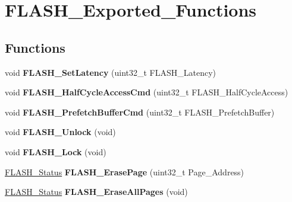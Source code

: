 \hypertarget{group__FLASH__Exported__Functions}{
\section{FLASH\_\-Exported\_\-Functions}
\label{group__FLASH__Exported__Functions}
}
\subsection*{Functions}
\begin{DoxyCompactItemize}
\item 
\hypertarget{group__FLASH__Exported__Functions_ga54bcb96270215c752c3479c8c9e438c0}{
void {\bfseries FLASH\_\-SetLatency} (uint32\_\-t FLASH\_\-Latency)}
\label{group__FLASH__Exported__Functions_ga54bcb96270215c752c3479c8c9e438c0}

\item 
\hypertarget{group__FLASH__Exported__Functions_ga978103a57b37920ac01128e999f9ece6}{
void {\bfseries FLASH\_\-HalfCycleAccessCmd} (uint32\_\-t FLASH\_\-HalfCycleAccess)}
\label{group__FLASH__Exported__Functions_ga978103a57b37920ac01128e999f9ece6}

\item 
\hypertarget{group__FLASH__Exported__Functions_ga6b93faaf0f560bf8d662b2cefe2f70e8}{
void {\bfseries FLASH\_\-PrefetchBufferCmd} (uint32\_\-t FLASH\_\-PrefetchBuffer)}
\label{group__FLASH__Exported__Functions_ga6b93faaf0f560bf8d662b2cefe2f70e8}

\item 
\hypertarget{group__FLASH__Exported__Functions_ga4084d0184bab463a1579271bf474aaef}{
void {\bfseries FLASH\_\-Unlock} (void)}
\label{group__FLASH__Exported__Functions_ga4084d0184bab463a1579271bf474aaef}

\item 
\hypertarget{group__FLASH__Exported__Functions_ga46899557353c4312ddbe3f25e65df1d8}{
void {\bfseries FLASH\_\-Lock} (void)}
\label{group__FLASH__Exported__Functions_ga46899557353c4312ddbe3f25e65df1d8}

\item 
\hypertarget{group__FLASH__Exported__Functions_ga13a2ca18bfb3d5fb827a2751799f8451}{
\hyperlink{group__FLASH__Exported__Types_gadc63a6f3404ff1f71229a66915e9cdc0}{FLASH\_\-Status} {\bfseries FLASH\_\-ErasePage} (uint32\_\-t Page\_\-Address)}
\label{group__FLASH__Exported__Functions_ga13a2ca18bfb3d5fb827a2751799f8451}

\item 
\hypertarget{group__FLASH__Exported__Functions_gab2e6dea62c72b3e47c17512579d37498}{
\hyperlink{group__FLASH__Exported__Types_gadc63a6f3404ff1f71229a66915e9cdc0}{FLASH\_\-Status} {\bfseries FLASH\_\-EraseAllPages} (void)}
\label{group__FLASH__Exported__Functions_gab2e6dea62c72b3e47c17512579d37498}


\end{DoxyCompactItemize}
